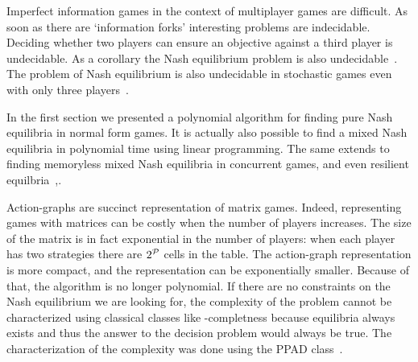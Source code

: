 Imperfect information games in the context of multiplayer games are difficult.
As soon as there are `information forks' interesting problems are indecidable.
Deciding whether two players can ensure an objective against a third player
is undecidable.
As a corollary the Nash equilibrium problem is also undecidable~\cite{Pnueli&Rosner:1990}.
The problem of Nash equilibrium is also undecidable in stochastic games even
with only three players~\cite{Bouyer&Markey&Stan:2014}.

In the first section we presented a polynomial algorithm for
finding pure Nash equilibria in normal form games.
It is actually also possible to find a mixed Nash equilibria in
polynomial time using linear programming.
The same extends to finding memoryless mixed Nash equilibria in concurrent
games, and even resilient equilbria~\cite{Brenguier:2016},.

Action-graphs are succinct representation of matrix games. Indeed,
representing games with matrices can be costly when the number of
players increases. The size of the matrix is in fact exponential in the
number of players: when each player has two strategies there are
\(2^{\mathcal{P}}\) cells in the table.
The action-graph representation is more compact, and the representation can be
exponentially smaller.
Because of that, the algorithm is no longer polynomial.
If there are no constraints on the Nash equilibrium we are looking for, the
complexity of the problem cannot be characterized using classical classes
like \NP-completness because equilibria always
exists and thus the answer to the decision problem would always be true.
The characterization of the complexity was done using the PPAD class~\cite{Daskalakis&Goldberg&Papadimitriou:2009}.

